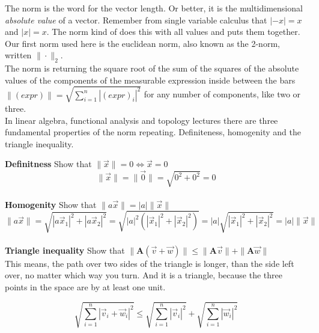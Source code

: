 \documentclass[a4paper]{article}
\begin{document}
The norm is the word for the vector length. Or better, it is the multidimensional \emph{absolute value} of a vector. Remember from single variable calculus that $|-x|=x$ and $|x|=x$. The norm kind of does this with all values and puts them together.
Our first norm used here is the euclidean norm, also known as the 2-norm, written $\|\cdot\|_{2}$. \\

 The norm is returning  the square root of the sum of the squares of the absolute values of the components of the measurable expression inside between the bars $\|(expr)\| = \sqrt{\sum_{i=1}^{n}|(expr)_{i}|^2}$ for any number of components, like two or three.\\

In linear algebra, functional analysis and topology lectures there are three fundamental properties of the norm repeating. Definiteness, homogenity and the triangle inequality. 

\textbf{Definitness} Show that $\|\vec{x}\| = 0 \iff \vec{x} = 0$\\

\begin{displaymath}
    \|\vec{x}\| = \|\vec{0}\| = \sqrt{0^{2} + 0^{2}} = 0
\end{displaymath}\\

\textbf{Homogenity} Show that $\|a\vec{x}\| = |a|\|\vec{x}\|$\\

\begin{displaymath}
    \|a\vec{x}\| = \sqrt{|a\vec{x}_1|^{2} + |a\vec{x}_2|^{2}} = \sqrt{|a|^{2}(|\vec{x}_1|^{2} + |\vec{x}_2|^{2})} = |a|\sqrt{|\vec{x}_1|^{2} + |\vec{x}_2|^{2}} = |a|\|\vec{x}\|
\end{displaymath}\\

\textbf{Triangle inequality} Show that $ \|\boldsymbol{A}(\vec{v} + \vec{w})\| \leq \|\boldsymbol{A}\vec{v}\| + \|\boldsymbol{A}\vec{w}\|$\\

This means, the path over two sides of the triangle is longer, than the side left over, no matter which way you turn. And it is a triangle, because the three points in the space are by at least one unit.

\begin{displaymath}
    \sqrt{\sum_{i=1}^{n}|\vec{v}_{i} + \vec{w}_{i}|^{2}} \leq \sqrt{\sum_{i=1}^{n}|\vec{v}_{i}|^{2}} + \sqrt{\sum_{i=1}^{n}|\vec{w}_{i}|^{2}} 
\end{displaymath}\\
\end{document}
